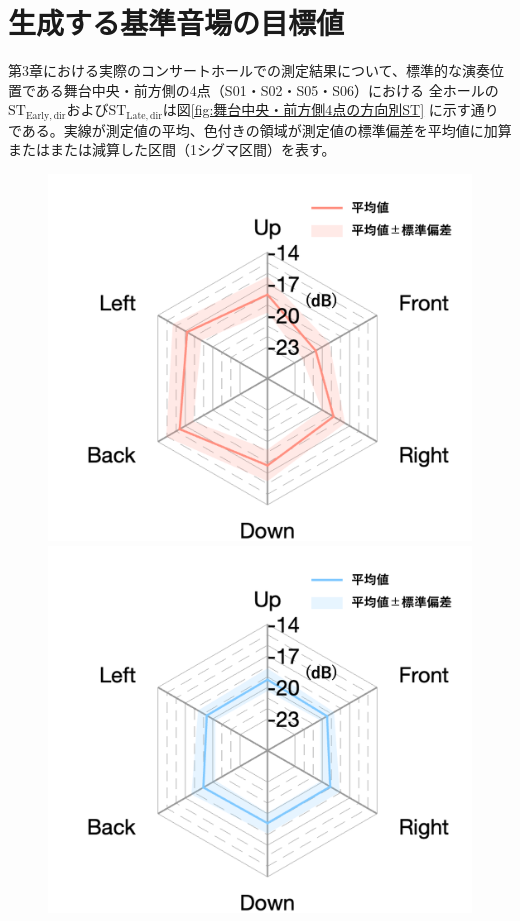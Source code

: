 \documentclass[11pt,a4j]{jreport}
\begin{document}
  \section{生成する基準音場の目標値}
    第3章における実際のコンサートホールでの測定結果について、標準的な演奏位置である舞台中央・前方側の4点（S01・S02・S05・S06）における
    全ホールの$\mathrm{ST_{Early,dir}}$および$\mathrm{ST_{Late,dir}}$は図\ref{fig:舞台中央・前方側4点の方向別ST}
    に示す通りである。実線が測定値の平均、色付きの領域が測定値の標準偏差を平均値に加算またはまたは減算した区間（1シグマ区間）を表す。

    \begin{figure}[H]
      \begin{minipage}
        [b]{.5\linewidth}
        \centering
        \includegraphics[width=1\linewidth]{images/targetFieldEarlywithLegend.png}
      \end{minipage}%
      \begin{minipage}
        [b]{.5\linewidth}
        \centering
        \includegraphics[width=1\linewidth]{images/targetFieldLatewithLegend.png}

\end{minipage}
\end{figure}
\end{document}
